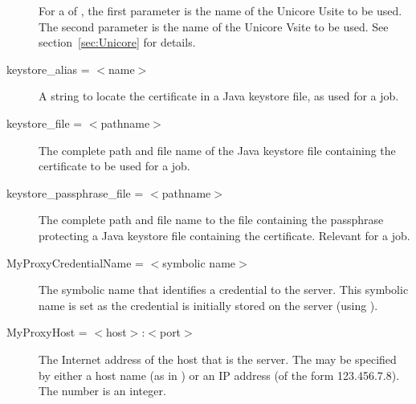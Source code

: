 \begin{description}
For a  of ,
the first parameter is the name of the Unicore Usite to be used.
The second parameter is the name of the Unicore Vsite to be used.
See section~\ref{sec:Unicore} for details.



\label{condor-submit-keystore-alias}
\item[keystore\_alias = $<$name$>$]
A string to locate the certificate in a Java keystore file,
as used for a  job.


\label{condor-submit-keystore-file}
\item[keystore\_file = $<$pathname$>$]
The complete path and file name of the Java keystore file
containing the certificate to be used for a  job.

\label{condor-submit-passphrase-file}
\item[keystore\_passphrase\_file = $<$pathname$>$]
The complete path and file name
to the file containing the passphrase protecting a Java keystore
file containing the certificate.
Relevant for a  job.


\label{condor-submit-MyProxyCredentialName}
\item[MyProxyCredentialName = $<$symbolic name$>$]
The symbolic name that identifies a credential to the  server.
This symbolic name is set as the credential is
initially stored on the server (using ).



\label{condor-submit-MyProxyHost}
\item[MyProxyHost = $<$host$>$:$<$port$>$]
The Internet address of the host that is the  server.
The  may be specified by either a host name
(as in ) or an IP address
(of the form 123.456.7.8).
The  number is an integer.



\end{description}

